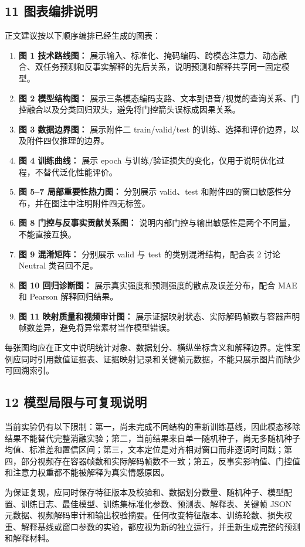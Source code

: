 \documentclass[
  12pt,
  a4paper,
]{ctexart}
\providecommand{\tightlist}{%
  \setlength{\itemsep}{0pt}\setlength{\parskip}{0pt}}
\begin{document}
\hypertarget{ux56feux8868ux7f16ux6392ux8bf4ux660e}{%
\subsection{11
图表编排说明}\label{ux56feux8868ux7f16ux6392ux8bf4ux660e}}

正文建议按以下顺序编排已经生成的图表：

\begin{enumerate}
\def\labelenumi{\arabic{enumi}.}
\tightlist
\item
  \textbf{图 1 技术路线图：}
  展示输入、标准化、掩码编码、跨模态注意力、动态融合、双任务预测和反事实解释的先后关系，说明预测和解释共享同一固定模型。
\item
  \textbf{图 2 模型结构图：}
  展示三条模态编码支路、文本到语音/视觉的查询关系、门控融合以及分类回归双头，避免将门控箭头误标成因果关系。
\item
  \textbf{图 3 数据边界图：} 展示附件二 train/valid/test
  的训练、选择和评价边界，以及附件四仅推理的边界。
\item
  \textbf{图 4 训练曲线：} 展示 epoch
  与训练/验证损失的变化，仅用于说明优化过程，不替代泛化性能评价。
\item
  \textbf{图 5--7 局部重要性热力图：} 分别展示 valid、test
  和附件四的窗口敏感性分布，并在图注中注明附件四无标签。
\item
  \textbf{图 8 门控与反事实贡献关系图：}
  说明内部门控与输出敏感性是两个不同量，不能直接互换。
\item
  \textbf{图 9 混淆矩阵：} 分别展示 valid 与 test 的类别混淆结构，配合表
  2 讨论 Neutral 类召回不足。
\item
  \textbf{图 10 回归诊断图：}
  展示真实强度和预测强度的散点及误差分布，配合 MAE 和 Pearson
  解释回归结果。
\item
  \textbf{图 11 映射质量和视频审计图：}
  展示证据映射状态、实际解码帧数与容器声明帧数差异，避免将异常素材当作模型错误。
\end{enumerate}

每张图均应在正文中说明统计对象、数据划分、横纵坐标含义和解释边界。定性案例应同时引用数值证据表、证据映射记录和关键帧元数据，不能只展示图片而缺少可回溯索引。

\hypertarget{ux6a21ux578bux5c40ux9650ux4e0eux53efux590dux73b0ux8bf4ux660e}{%
\subsection{12
模型局限与可复现说明}\label{ux6a21ux578bux5c40ux9650ux4e0eux53efux590dux73b0ux8bf4ux660e}}

当前实验仍有以下限制：第一，尚未完成不同结构的重新训练基线，因此模态移除结果不能替代完整消融实验；第二，当前结果来自单一随机种子，尚无多随机种子均值、标准差和置信区间；第三，文本定位是对齐相对窗口而非逐词时间戳；第四，部分视频存在容器帧数和实际解码帧数不一致；第五，反事实影响值、门控值和注意力权重都不能被解释为真实情感原因。

为保证复现，应同时保存特征版本及校验和、数据划分数量、随机种子、模型配置、训练日志、最佳模型、训练集标准化参数、预测表、解释表、关键帧
JSON
元数据、视频解码审计和输出校验摘要。任何改变特征版本、训练轮数、损失权重、解释基线或窗口参数的实验，都应视为新的独立运行，并重新生成完整的预测和解释材料。
\end{document}
